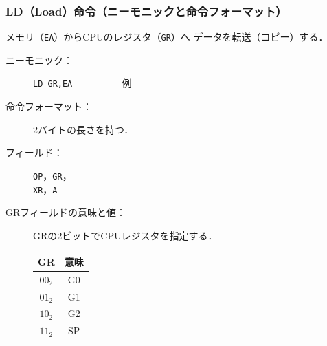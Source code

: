 \documentclass{beamer}                 %
\begin{document}
\begin{frame}
  \frametitle{LD（Load）命令（ニーモニックと命令フォーマット）}
  メモリ（\texttt{EA}）からCPUのレジスタ（\texttt{GR}）へ
  データを転送（コピー）する．

  \begin{description}
  \item[ニーモニック：] \texttt{LD GR,EA} ~~~~~~~~~ 例
    \vspace{0.5cm}

  \item[命令フォーマット：] 2バイトの長さを持つ．\\
  \item[フィールド：] \texttt{OP}，\texttt{GR}，\\ \texttt{XR}，\texttt{A}

  \item[GRフィールドの意味と値：]GRの2ビットでCPUレジスタを指定する．\\
    {\small\begin{center}
      \begin{tabular}{c|c} \hline\hline
        GR & 意味 \\
        \hline
        $00_2$ & G0 \\
        $01_2$ & G1 \\
        $10_2$ & G2 \\
        $11_2$ & SP \\
      \end{tabular}
    \end{center}}

  \end{description}
\end{frame}
\end{document}

